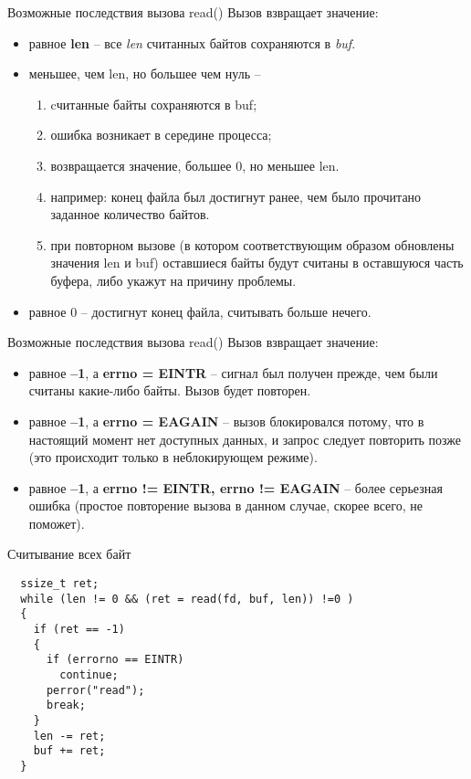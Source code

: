 \documentclass[xcolor=table]{beamer}
\begin{document}
\begin{frame}{Возможные последствия вызова read()}
	Вызов взвращает значение:
	\begin{itemize}
		\item равное \textbf{len} -- все \textit{len} считанных байтов сохраняются в \textit{buf}. 
		\item меньшее, чем len, но большее чем нуль -- 
			\begin{enumerate}
				\item cчитанные байты сохраняются в buf;
				\item ошибка возникает в середине процесса; 
				\item возвращается значение, большее 0, но меньшее len. 
				\item например: конец файла был достигнут ранее, чем было прочитано заданное количество байтов. 
				\item при повторном вызове (в котором соответствующим образом обновлены значения len и buf) оставшиеся байты будут считаны в оставшуюся часть буфера, либо укажут на причину проблемы.
			\end{enumerate}		 
		\item равное 0 -- достигнут конец файла, считывать больше нечего.
	\end{itemize}
\end{frame}

\begin{frame}{Возможные последствия вызова read()}
	Вызов взвращает значение:
	\begin{itemize}
	\item равное \textbf{–1}, а \textbf{errno = EINTR} -- сигнал был получен прежде, чем были считаны какие­-либо байты. Вызов будет повторен.
	\item равное \textbf{–1}, а \textbf{errno = EAGAIN} -- вызов блокировался потому, что в настоящий момент нет доступных данных, и запрос следует повторить позже (это происходит только в неблокирующем режиме).
	\item равное \textbf{–1}, а \textbf{errno != EINTR, errno != EAGAIN} -- более серьезная ошибка (простое повторение вызова в данном случае, скорее всего, не поможет).
	\end{itemize}
\end{frame}

\begin{frame}[fragile]{Считывание всех байт}
\begin{verbatim}
  ssize_t ret;
  while (len != 0 && (ret = read(fd, buf, len)) !=0 )  
  {
    if (ret == -1)
    {
      if (errorno == EINTR)
        continue;
      perror("read");
      break;
    }
    len -= ret;
    buf += ret;
  }
\end{verbatim}
\end{frame}
\end{document}
